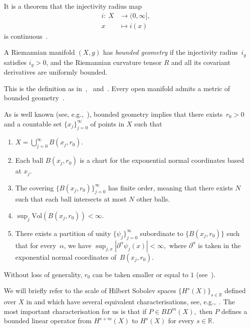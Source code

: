 \documentclass[pdftex]{sigma}
\numberwithin{equation}{section}
\begin{document}
It is a theorem that the injectivity radius map \begin{align*}
 i \colon \ X&\to (0, \infty],\\
 x&\mapsto i(x)
\end{align*}
is continuous~\cite[Proposition~III.4.13]{Sakai1996}.

\begin{Definition}\label{D:bounded_geometry}
A Riemannian manifold $(X,g)$ has \textit{bounded geometry} if the injectivity radius~$i_g$ satisfies
$i_g >0$,  and the Riemannian curvature tensor $R$ and all its covariant derivatives are uniformly bounded.
\end{Definition}

This is the definition as in~\cite[Definition 1.1]{Kordyukov1991},~\cite[Chapter II]{Eichhorn2008} and~\cite[Chapter 3]{Eichhorn2007}. Every open manifold admits a metric of bounded geometry~\cite{Greene1978}.

As is well known (see, e.g.,~\cite[Lemma 2.4]{Kordyukov1991}), bounded geometry implies that there exists~${r_0>0}$ and a countable set $\{x_j\}_{j=0}^\infty$ of points in $X$ such that
\begin{enumerate}\itemsep=0pt
 \item{} $X = \bigcup_{j=0}^\infty B(x_j,r_0)$.
 \item{} Each ball $B(x_j,r_0)$ is a chart for the exponential normal coordinates based at $x_j$.
 \item{} The covering $\{B(x_j,r_0)\}_{j=0}^\infty$ has finite order, meaning that there exists $N$ such that each ball intersects at most $N$ other balls.
 \item{} $\sup_j \mathrm{Vol}(B(x_j,r_0)) < \infty.$
 \item{} There exists a partition of unity $\{\psi_j\}_{j=0}^\infty$ subordinate to $\{B(x_j,r_0)\}$ such that for every~$\alpha$, we have $\sup_{j,x} |\partial^{\alpha}\psi_j(x)|<\infty,$ where $\partial^{\alpha}$ is taken in the exponential normal coordinates of~$B(x_j,r_0).$
\end{enumerate}
Without loss of generality, $r_0$ can be taken smaller or equal to $1$ (see~\cite[Lemma~2.3]{Kordyukov1991}).


We will briefly refer to the scale of Hilbert Sobolev spaces $\{H^s(X)\}_{s\in \mathbb{R}}$ defined over $X$ in \cite[Section 3]{Kordyukov1991} and which have several equivalent characterisations, see, e.g.,~\cite{GrosseSchneider2013}. The most important characterisation for us is that if $P \in BD^m(X),$ then $P$ defines a bounded linear operator from $H^{s+m}(X)$ to $H^s(X)$ for every $s\in \mathbb{R}$.
\end{document}
